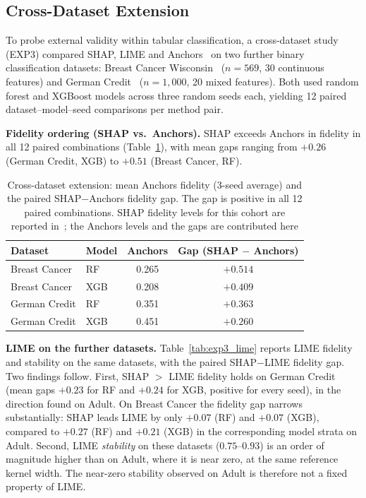 \documentclass[11pt,a4paper]{article}
\begin{document}
\subsection{Cross-Dataset Extension}
\label{sec:exp3}

To probe external validity within tabular classification, a cross-dataset
study (EXP3) compared SHAP, LIME and Anchors~\cite{ribeiro2018anchors} on
two further binary classification datasets: Breast Cancer
Wisconsin~\cite{dua2019uci,wolberg1993breast} ($n=569$, 30 continuous
features) and German Credit~\cite{dua2019uci,hofmann1994statlog}
($n=1{,}000$, 20 mixed features). Both used random forest and XGBoost
models across three random seeds each, yielding 12 paired
dataset--model--seed comparisons per method pair.

\textbf{Fidelity ordering (SHAP vs.\ Anchors).} SHAP exceeds Anchors in
fidelity in all 12 paired combinations (Table~\ref{tab:exp3_fidelity}),
with mean gaps ranging from $+0.26$ (German Credit, XGB) to $+0.51$ (Breast
Cancer, RF).

\begin{table}[htb]
\centering
\caption{Cross-dataset extension: mean Anchors fidelity (3-seed average)
and the paired SHAP$-$Anchors fidelity gap. The gap is positive in all 12
paired combinations. SHAP fidelity levels for this cohort are reported
in~\cite{herrera2026framework}; the Anchors levels and the gaps are
contributed here}
\label{tab:exp3_fidelity}
\begin{tabular}{llcc}
\toprule
Dataset        & Model & Anchors & Gap (SHAP $-$ Anchors) \\
\midrule
Breast Cancer  & RF    & 0.265   & $+0.514$ \\
Breast Cancer  & XGB   & 0.208   & $+0.409$ \\
German Credit  & RF    & 0.351   & $+0.363$ \\
German Credit  & XGB   & 0.451   & $+0.260$ \\
\bottomrule
\end{tabular}
\end{table}

\textbf{LIME on the further datasets.} Table~\ref{tab:exp3_lime} reports
LIME fidelity and stability on the same datasets, with the paired
SHAP$-$LIME fidelity gap. Two findings follow.
First, SHAP $>$ LIME fidelity holds on German Credit (mean gaps $+0.23$ for
RF and $+0.24$ for XGB, positive for every seed), in the direction found on
Adult. On Breast Cancer the fidelity gap narrows substantially: SHAP leads
LIME by only $+0.07$ (RF) and $+0.07$ (XGB), compared to $+0.27$ (RF) and
$+0.21$ (XGB) in the corresponding model strata on Adult. Second, LIME
\emph{stability} on these datasets ($0.75$--$0.93$) is an order of
magnitude higher than on Adult, where it is near zero, at the same
reference kernel width. The near-zero stability observed on Adult is
therefore not a fixed property of LIME.
\end{document}

